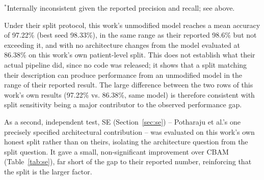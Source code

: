 \noindent $^*$Internally inconsistent given the reported precision and recall; see above.

Under their split protocol, this work's unmodified model reaches a mean accuracy of 97.22\% (best seed 98.33\%), in the same range as their reported 98.6\% but not exceeding it, and with no architecture changes from the model evaluated at 86.38\% on this work's own patient-level split. This does not establish what their actual pipeline did, since no code was released; it shows that a split matching their description can produce performance from an unmodified model in the range of their reported result. The large difference between the two rows of this work's own results (97.22\% vs. 86.38\%, same model) is therefore consistent with split sensitivity being a major contributor to the observed performance gap.

As a second, independent test, SE (Section~\ref{sec:se}) -- Potharaju et al.'s one precisely specified architectural contribution -- was evaluated on this work's own honest split rather than on theirs, isolating the architecture question from the split question. It gave a small, non-significant improvement over CBAM (Table~\ref{tab:se}), far short of the gap to their reported number, reinforcing that the split is the larger factor.

